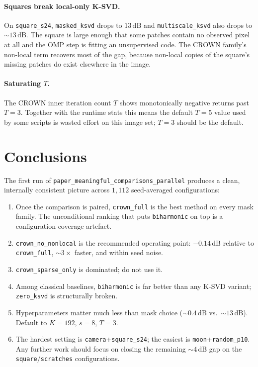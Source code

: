 \documentclass[11pt,a4paper]{article}
\newcommand{\method}[1]{\texttt{#1}}
\newcommand{\dB}{\,\textrm{dB}}
\begin{document}
\paragraph{Squares break local-only K-SVD.}
On \texttt{square\_s24}, \method{masked\_ksvd} drops to $13\dB$
and \method{multiscale\_ksvd} also drops to $\sim13\dB$. The
square is large enough that some patches contain no observed
pixel at all and the OMP step is fitting an unsupervised code.
The CROWN family's non-local term recovers most of the gap,
because non-local copies of the square's missing patches do
exist elsewhere in the image.

\paragraph{Saturating $T$.}
The CROWN inner iteration count $T$ shows monotonically negative
returns past $T=3$. Together with the runtime stats this means
the default $T=5$ value used by some scripts is wasted effort
on this image set; $T=3$ should be the default.

\section{Conclusions}\label{sec:conclusions}

The first run of \texttt{paper\_meaningful\_comparisons\_parallel}
produces a clean, internally consistent picture across $1{,}112$
seed-averaged configurations:

\begin{enumerate}[leftmargin=1.6em,itemsep=2pt,topsep=2pt]
\item Once the comparison is paired, \method{crown\_full} is the
best method on every mask family. The unconditional ranking that
puts \method{biharmonic} on top is a configuration-coverage
artefact.
\item \method{crown\_no\_nonlocal} is the recommended operating
point: $-0.14\dB$ relative to \method{crown\_full}, $\sim3\times$
faster, and within seed noise.
\item \method{crown\_sparse\_only} is dominated; do not use it.
\item Among classical baselines, \method{biharmonic} is far
better than any K-SVD variant; \method{zero\_ksvd} is structurally
broken.
\item Hyperparameters matter much less than mask choice
($\sim0.4\dB$ vs.\ $\sim13\dB$). Default to $K=192$, $s=8$, $T=3$.
\item The hardest setting is \texttt{camera}+\texttt{square\_s24};
the easiest is \texttt{moon}+\texttt{random\_p10}. Any further
work should focus on closing the remaining $\sim4\dB$ gap on the
\texttt{square}/\texttt{scratches} configurations.
\end{enumerate}
\end{document}
